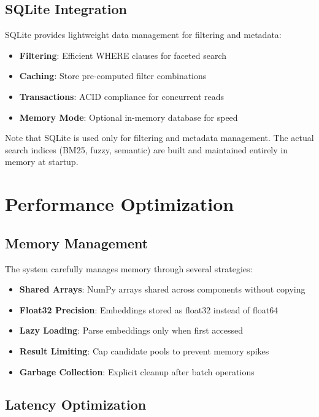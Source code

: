 \subsection{SQLite Integration}

SQLite provides lightweight data management for filtering and metadata:

\begin{itemize}[leftmargin=*,itemsep=2pt,topsep=2pt]
  \item \textbf{Filtering}: Efficient WHERE clauses for faceted search
  \item \textbf{Caching}: Store pre-computed filter combinations
  \item \textbf{Transactions}: ACID compliance for concurrent reads
  \item \textbf{Memory Mode}: Optional in-memory database for speed
\end{itemize}

Note that SQLite is used only for filtering and metadata management. The actual search indices (BM25, fuzzy, semantic) are built and maintained entirely in memory at startup.

\section{Performance Optimization}

\subsection{Memory Management}

The system carefully manages memory through several strategies:

\begin{itemize}[leftmargin=*,itemsep=2pt,topsep=2pt]
  \item \textbf{Shared Arrays}: NumPy arrays shared across components without copying
  \item \textbf{Float32 Precision}: Embeddings stored as float32 instead of float64
  \item \textbf{Lazy Loading}: Parse embeddings only when first accessed
  \item \textbf{Result Limiting}: Cap candidate pools to prevent memory spikes
  \item \textbf{Garbage Collection}: Explicit cleanup after batch operations
\end{itemize}

\subsection{Latency Optimization}

